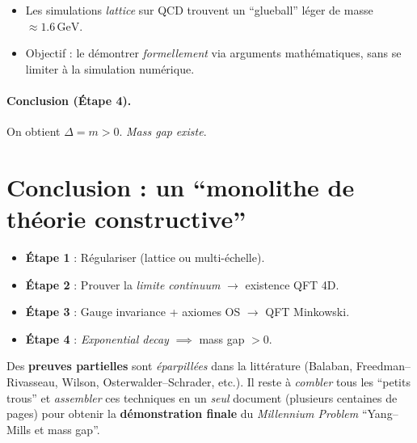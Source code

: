 \documentclass[11pt]{article}
\begin{document}
\begin{itemize}
  \item Les simulations \emph{lattice} sur QCD trouvent un “glueball” léger de masse $\approx 1.6\,\mathrm{GeV}$.
  \item Objectif : le démontrer \emph{formellement} via arguments mathématiques, sans se limiter à la simulation numérique.
\end{itemize}

\paragraph{Conclusion (Étape 4).}
On obtient $\Delta = m>0$. \emph{Mass gap} \emph{existe}.

\section*{Conclusion : un “monolithe de théorie constructive”}

\begin{itemize}
  \item \textbf{Étape 1} : Régulariser (lattice ou multi-échelle).
  \item \textbf{Étape 2} : Prouver la \emph{limite continuum} $\to$ existence QFT 4D.
  \item \textbf{Étape 3} : Gauge invariance + axiomes OS $\to$ QFT Minkowski.
  \item \textbf{Étape 4} : \emph{Exponential decay} $\implies$ mass gap $>0$.
\end{itemize}

\noindent
Des \textbf{preuves partielles} sont \emph{éparpillées} dans la littérature (Balaban, Freedman--Rivasseau, Wilson, Osterwalder--Schrader, etc.). Il reste à \emph{combler} tous les “petits trous” et \emph{assembler} ces techniques en un \emph{seul} document (plusieurs centaines de pages) pour obtenir la \textbf{démonstration finale} du \emph{Millennium Problem} “Yang--Mills et mass gap”.
\end{document}
